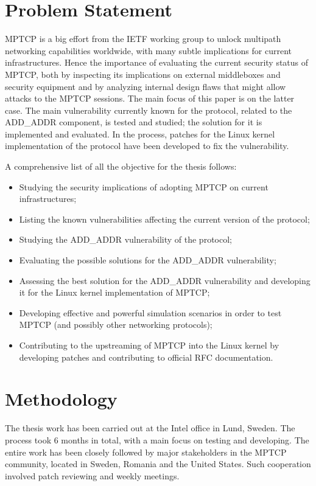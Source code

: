 \section{Problem Statement}
MPTCP is a big effort from the IETF working group to unlock multipath networking capabilities worldwide, with many subtle implications for current infrastructures. Hence the importance of evaluating the current security status of MPTCP, both by inspecting its implications on external middleboxes and security equipment and by analyzing internal design flaws that might allow attacks to the MPTCP sessions. The main focus of this paper is on the latter case. The main vulnerability currently known for the protocol, related to the ADD\_ADDR component, is tested and studied; the solution for it is implemented and evaluated. In the process, patches for the Linux kernel implementation of the protocol have been developed to fix the vulnerability. 


A comprehensive list of all the objective for the thesis follows:
\begin{itemize}
    \item Studying the security implications of adopting MPTCP on current infrastructures; 
    \item Listing the known vulnerabilities affecting the current version of the protocol; 
    \item Studying the ADD\_ADDR vulnerability of the protocol;
    \item Evaluating the possible solutions for the ADD\_ADDR vulnerability; 
    \item Assessing the best solution for the ADD\_ADDR vulnerability and developing it for the Linux kernel implementation of MPTCP;
    \item Developing effective and powerful simulation scenarios in order to test MPTCP (and possibly other networking protocols);
    \item Contributing to the upstreaming of MPTCP into the Linux kernel by developing patches and contributing to official RFC documentation.
\end{itemize}

\section{Methodology}
The thesis work has been carried out at the Intel office in Lund, Sweden. The process took 6 months in total, with a main focus on testing and developing. The entire work has been closely followed by major stakeholders in the MPTCP community, located in Sweden, Romania and the United States. Such cooperation involved patch reviewing and weekly meetings.


